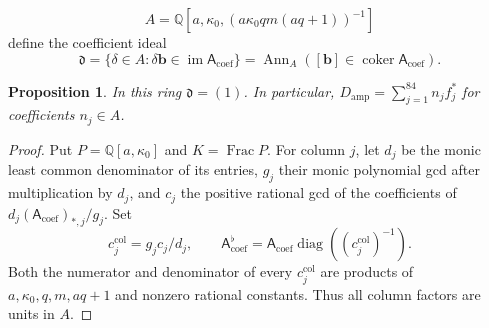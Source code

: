 \documentclass[11pt,a4paper]{article}
\numberwithin{equation}{section}
\theoremstyle{plain}
\newtheorem{proposition}[theorem]{Proposition}
\theoremstyle{definition}
\theoremstyle{remark}
\begin{document}
\[
 A=\mathbb Q[a,\kappa_0,
    (a\kappa_0q m(aq+1))^{-1}]
\]
define the coefficient ideal
\[
 \mathfrak d
 =\{\delta\in A:\delta\mathbf b\in\operatorname{im}\mathsf A_{\mathrm{coef}}\}
 =\operatorname{Ann}_A([\mathbf b]\in\operatorname{coker}\mathsf A_{\mathrm{coef}}).
\]
\begin{proposition}\label{r3:cone-coefficient-ideal}
In this ring $\mathfrak d=(1)$. In particular,
$D_{\mathrm{amp}}=\sum_{j=1}^{84}n_jf_j^*$ for coefficients $n_j\in A$.
\end{proposition}
\begin{proof}
Put $P=\mathbb Q[a,\kappa_0]$ and $K=\operatorname{Frac}P$.
For column $j$, let $d_j$ be the monic least common denominator of its
entries, $g_j$ their monic polynomial gcd after multiplication by $d_j$,
and $c_j$ the positive rational gcd of the coefficients of
$d_j(\mathsf A_{\mathrm{coef}})_{*,j}/g_j$. Set
\[
 c_j^{\mathrm{col}}=g_jc_j/d_j,\qquad
 \mathsf A_{\mathrm{coef}}^\flat=\mathsf A_{\mathrm{coef}}\operatorname{diag}
            ((c_j^{\mathrm{col}})^{-1}).
\]
Both the numerator and denominator of every $c_j^{\mathrm{col}}$ are
products of $a,\kappa_0,q,m,aq+1$ and nonzero rational constants.
Thus all column factors are units in $A$.


\end{proof}
\end{document}

